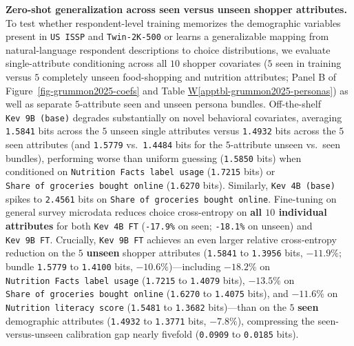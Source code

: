 \documentclass[
  letterpaper,
  DIV=11,
  numbers=noendperiod]{scrartcl}
\newcommand*\quartoapptblref[1]{Table \hyperref[#1]{W\ref{#1}}}
\begin{document}
\textbf{Zero-shot generalization across seen versus unseen shopper
attributes.} To test whether respondent-level training memorizes the
demographic variables present in \texttt{US\ ISSP} and
\texttt{Twin-2K-500} or learns a generalizable mapping from
natural-language respondent descriptions to choice distributions, we
evaluate single-attribute conditioning across all \(10\) shopper
covariates (\(5\) seen in training versus \(5\) completely unseen
food-shopping and nutrition attributes; Panel B of
Figure~\ref{fig-grummon2025-coefs} and
\quartoapptblref{apptbl-grummon2025-personas}) as well as separate
\(5\)-attribute seen and unseen persona bundles. Off-the-shelf
\texttt{Kev\ 9B\ (base)} degrades substantially on novel behavioral
covariates, averaging \texttt{1.5841} bits across the \(5\) unseen
single attributes versus \texttt{1.4932} bits across the \(5\) seen
attributes (and \texttt{1.5779} vs.~\texttt{1.4484} bits for the
\(5\)-attribute unseen vs.~seen bundles), performing worse than uniform
guessing (\texttt{1.5850} bits) when conditioned on
\texttt{Nutrition\ Facts\ label\ usage} (\texttt{1.7215} bits) or
\texttt{Share\ of\ groceries\ bought\ online} (\texttt{1.6270} bits).
Similarly, \texttt{Kev\ 4B\ (base)} spikes to \texttt{2.4561} bits on
\texttt{Share\ of\ groceries\ bought\ online}. Fine-tuning on general
survey microdata reduces choice cross-entropy on \textbf{all \(10\)
individual attributes} for both \texttt{Kev\ 4B\ FT} (\texttt{-17.9\%}
on seen; \texttt{-18.1\%} on unseen) and \texttt{Kev\ 9B\ FT}.
Crucially, \texttt{Kev\ 9B\ FT} achieves an even larger relative
cross-entropy reduction on the \(5\) \textbf{unseen} shopper attributes
(\texttt{1.5841} to \texttt{1.3956} bits, \(-11.9\%\); bundle
\texttt{1.5779} to \texttt{1.4100} bits, \(-10.6\%\))---including
\(-18.2\%\) on \texttt{Nutrition\ Facts\ label\ usage} (\texttt{1.7215}
to \texttt{1.4079} bits), \(-13.5\%\) on
\texttt{Share\ of\ groceries\ bought\ online} (\texttt{1.6270} to
\texttt{1.4075} bits), and \(-11.6\%\) on
\texttt{Nutrition\ literacy\ score} (\texttt{1.5481} to \texttt{1.3682}
bits)---than on the \(5\) \textbf{seen} demographic attributes
(\texttt{1.4932} to \texttt{1.3771} bits, \(-7.8\%\)), compressing the
seen-versus-unseen calibration gap nearly fivefold (\texttt{0.0909} to
\texttt{0.0185} bits).
\end{document}
